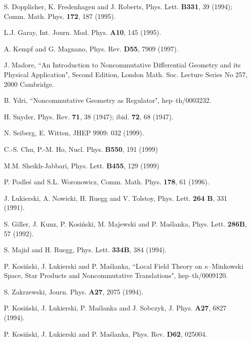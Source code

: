 \documentclass[a4paper,12pt]{article}
\begin{document}
\begin{thebibliography}{99}

 S. Dopplicher, K. Fredenhagen and J. Roberts,
  Phys. Lett. {\bf B331}, {39}
(1994);  Comm. Math. Phys.  {\bf 172}, {187} (1995).

 L.J. Garay, Int. Journ. Mod. Phys.
    {\bf A10}, {145} (1995).

 A. Kempf and G. Magnano,   Phys.
 Rev. {\bf D55}, {7909} (1997).

 J. Madore, ``An Introduction to Noncommutative
 Differential Geometry and its Physical Application", Second
 Edition, London Math. Soc. Lecture Series No 257, 2000 
Cambridge.

  B. Ydri, ``Noncommutative Geometry as 
 Regulator", hep--th/0003232.


 H. Snyder, Phys. Rev.  {\bf 71}, 38 (1947);
 ibid. {\bf 72}, 68 (1947).

  N. Seiberg, E. Witten, JHEP 9909: 032 (1999).

 C.-S. Chu, P.-M. Ho, Nucl. Phys. {\bf B550}, 191 
(1999)

 M.M. Sheikh-Jabbari, Phys. Lett. {\bf B455}, 129 
(1999)

 P. Podle\'{s} and S.L. Woronowicz, Comm. Math.
Phys. {\bf 178}, 61 (1996).

 J. Lukierski, A. Nowicki, H. Ruegg and V.
Tolstoy,
 Phys. Lett. {\bf 264 B}, 331 (1991).

  S. Giller, J. Kunz, P. Kosi\'{n}ski, M. Majewski
  and P. Ma\'{s}lanka, Phys. Lett. {\bf 286B}, 57 (1992).

   S. Majid and H. Ruegg, Phys. Lett. {\bf 334B},
  384 (1994).

   P. Kosi\'{n}ski, J. Lukierski and P.
  Ma\'{s}lanka, ``Local  Field Theory on $\kappa$--Minkowski
  Space, Star Products and Noncommutative Translations",
   hep--th/0009120.

    S. Zakrzewski, Journ. Phys. {\bf A27}, 2075
    (1994).

     P. Kosi\'{n}ski, J. Lukierski, P. Ma\'{s}lanka 
 and J. Sobczyk, J. Phys. {\bf A27}, 6827 (1994).

     P. Kosi\'{n}ski, J. Lukierski and P.
    Ma\'{s}lanka, Phys. Rev. {\bf D62}, 025004.

\end{thebibliography}
\end{document}

